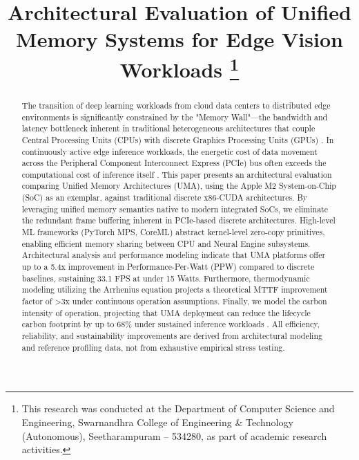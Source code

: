 \documentclass[conference]{IEEEtran}
\begin{document}
\title{Architectural Evaluation of Unified Memory Systems for Edge Vision Workloads
\thanks{This research was conducted at the Department of Computer Science and Engineering, Swarnandhra College of Engineering \& Technology (Autonomous), Seetharampuram – 534280, as part of academic research activities.}
}

\author{
}

\maketitle

\begin{abstract}
The transition of deep learning workloads from cloud data centers to distributed edge environments is significantly constrained by the "Memory Wall"—the bandwidth and latency bottleneck inherent in traditional heterogeneous architectures that couple Central Processing Units (CPUs) with discrete Graphics Processing Units (GPUs) \cite{b2}. In continuously active edge inference workloads, the energetic cost of data movement across the Peripheral Component Interconnect Express (PCIe) bus often exceeds the computational cost of inference itself \cite{b8}. This paper presents an architectural evaluation comparing Unified Memory Architectures (UMA), using the Apple M2 System-on-Chip (SoC) as an exemplar, against traditional discrete x86-CUDA architectures. By leveraging unified memory semantics native to modern integrated SoCs, we eliminate the redundant frame buffering inherent in PCIe-based discrete architectures. High-level ML frameworks (PyTorch MPS, CoreML) abstract kernel-level zero-copy primitives, enabling efficient memory sharing between CPU and Neural Engine subsystems. Architectural analysis and performance modeling indicate that UMA platforms offer up to a 5.4x improvement in Performance-Per-Watt (PPW) compared to discrete baselines, sustaining 33.1 FPS at under 15 Watts. Furthermore, thermodynamic modeling utilizing the Arrhenius equation projects a theoretical MTTF improvement factor of >3x under continuous operation assumptions. Finally, we model the carbon intensity of operation, projecting that UMA deployment can reduce the lifecycle carbon footprint by up to 68\% under sustained inference workloads \cite{b12}. All efficiency, reliability, and sustainability improvements are derived from architectural modeling and reference profiling data, not from exhaustive empirical stress testing.
\end{abstract}
\end{document}
